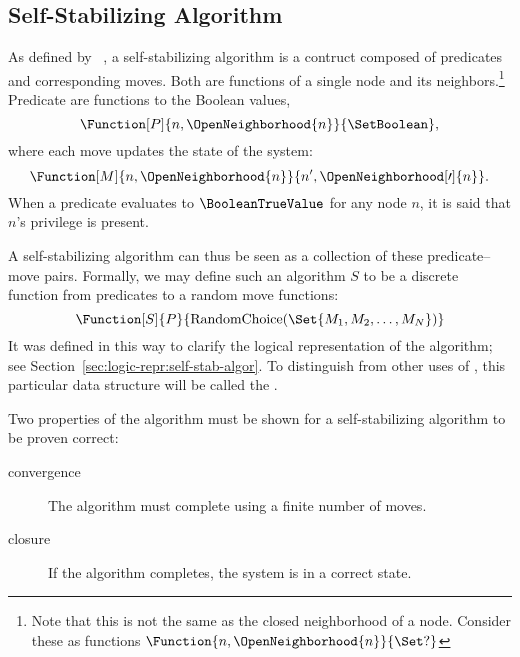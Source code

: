 \subsection{Self-Stabilizing Algorithm}
\label{sec:math-define:self-stab-algor}

As defined by \citeauthor{Dijkstra:1974:SSS:361179.361202}~\autocite{Dijkstra:1974:SSS:361179.361202},
  a self-stabilizing algorithm is a contruct composed of
  predicates and corresponding moves.
Both are functions of a single node and its neighbors.\footnote{%
  Note that this is not the same as the closed neighborhood of a node.
  Consider these as functions $\Function{n, \OpenNeighborhood{n}}{\Set ?}$}
Predicate are functions to the Boolean values,
  \begin{equation}
  \label{eq:define-predicate}
  \Function[P]{n, \OpenNeighborhood{n}}{\SetBoolean},
  \end{equation}
  where each move updates the state of the system:
  \begin{equation}
  \label{eq:define-move}
  \Function[M]{n, \OpenNeighborhood{n}}{n^\prime, \OpenNeighborhood[\prime]{n}}.
  \end{equation}
When a predicate evaluates to $\BooleanTrueValue$ for any node $n$,
  it is said that $n$'s privilege is present.

A self-stabilizing algorithm can thus be seen as
  a collection of these predicate--move pairs.
Formally, we may define such an algorithm $S$ to be a discrete function
  from predicates to a random move functions:
  \begin{equation}
    \label{eq:define-ssalg}
    \Function[S]{P}{\operatorname{RandomChoice}(\Set{M_1, M_2, \dots, M_N})}
  \end{equation}
It was defined in this way to clarify the logical representation of the algorithm;
  see Section~\ref{sec:logic-repr:self-stab-algor}.
To distinguish from other uses of ,
  this particular data structure will be called the .

Two properties of the algorithm must be shown
  for a self-stabilizing algorithm to be proven correct:~\autocite{arora:closure-and-convergence}
\begin{description}
\item[convergence] The algorithm must complete using a finite number of moves.
\item[closure] If the algorithm completes, the system is in a correct state.
\end{description}

